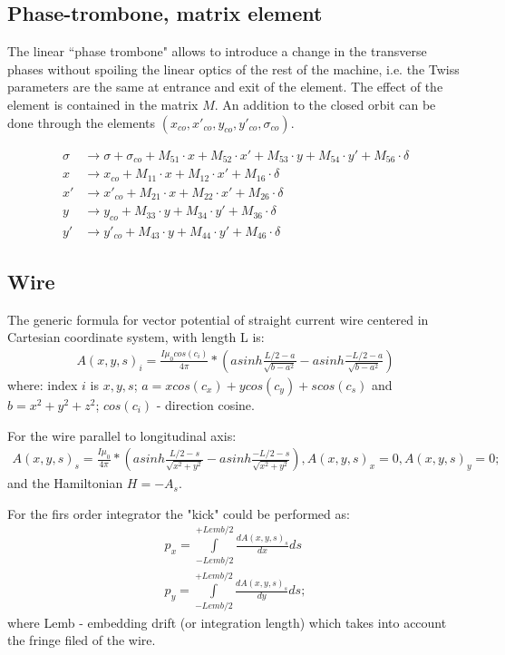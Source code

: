 \documentclass[english]{article}
\begin{document}
\subsection{Phase-trombone, matrix element}
The linear ``phase trombone" allows to introduce a change in the transverse phases 
without spoiling the linear optics of the rest of the machine, i.e. the Twiss 
parameters are the same at entrance and exit of the element. The effect of the element 
is contained in the matrix $M$. An addition to the closed orbit can be done through the
elements $(x_{co},x'_{co},y_{co},y'_{co},\sigma_{co})$.

\begin{align}
    \sigma & \to \sigma + \sigma_{co} + M_{51}\cdot x + M_{52}\cdot x' 
    + M_{53}\cdot y + M_{54}\cdot y' + M_{56}\cdot\delta \\
    x & \to x_{co} + M_{11}\cdot x + M_{12}\cdot x' + M_{16}\cdot\delta \\
    x' & \to x'_{co} + M_{21}\cdot x + M_{22}\cdot x' + M_{26}\cdot\delta \\
    y & \to y_{co} + M_{33}\cdot y + M_{34}\cdot y' + M_{36}\cdot\delta \\
    y' & \to y'_{co} + M_{43}\cdot y + M_{44}\cdot y' + M_{46}\cdot\delta
\end{align}

\subsection{Wire}
The generic formula for vector potential of straight current wire centered in Cartesian coordinate system, with length L is:  
\begin{align}
	{A(x,y,s)_i} =\frac{I\mu_0cos(c_i)}{4\pi}*(asinh\frac{L/2-a}{\sqrt{b-a^2}}-asinh\frac{-L/2-a}{\sqrt{b-a^2}})
\end{align}
where:
index $i$ is $x,y,s$; ${a=xcos(c_x)+ycos(c_y)+scos(c_s)}$ and ${b=x^2+y^2+z^2}$; $cos(c_i)$ - direction cosine.

For the wire parallel to longitudinal axis:
\begin{align}
	{A(x,y,s)_s} =\frac{I\mu_0}{4\pi}*(asinh\frac{L/2-s}{\sqrt{x^2+y^2}}-asinh\frac{-L/2-s}{\sqrt{x^2+y^2}}), {A(x,y,s)_x}=0, {A(x,y,s)_y}=0;
\end{align}  
and the Hamiltonian $H=-A_s$. 

For the firs order integrator the "kick" could be performed as:
\begin{align}
 p_x=\int\limits_{-L{emb}/2}^{+L{emb}/2}{\frac{dA(x,y,s)_s}{dx}ds} \\
 p_y=\int\limits_{-L{emb}/2}^{+L{emb}/2}{\frac{dA(x,y,s)_s}{dy}ds};
\end{align}
where Lemb - embedding drift (or integration length) which takes into account the fringe filed of the wire.
\end{document}

